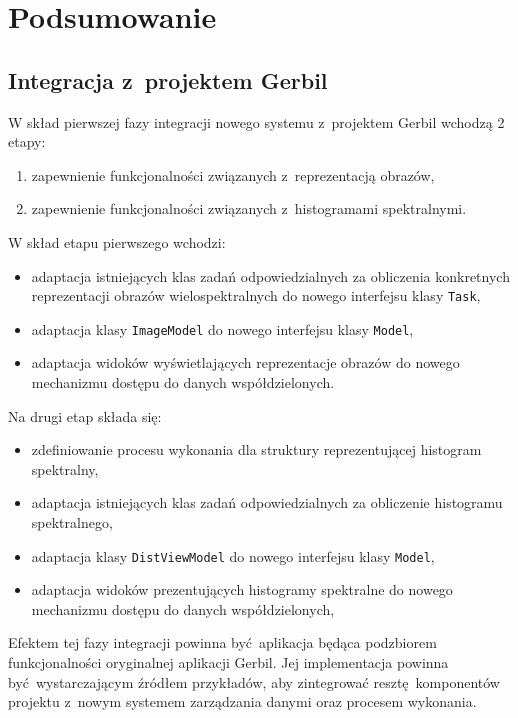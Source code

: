 \chapter{Podsumowanie}

\section{Integracja z~projektem Gerbil}
W skład pierwszej fazy integracji nowego systemu z~projektem Gerbil wchodzą 2 etapy:
\begin{enumerate}[labelwidth=\widthof{\ref{last-item2}},label=\arabic*.]
	\item zapewnienie funkcjonalności związanych z~reprezentacją obrazów,
	\item zapewnienie funkcjonalności związanych z~histogramami spektralnymi.
\end{enumerate}

W skład etapu pierwszego wchodzi: 
\begin{itemize}
		\item adaptacja istniejących klas zadań odpowiedzialnych za obliczenia konkretnych reprezentacji obrazów wielospektralnych do nowego interfejsu klasy \lstinline$Task$,
		\item adaptacja klasy \lstinline$ImageModel$ do nowego interfejsu klasy \lstinline$Model$,
		\item adaptacja widoków wyświetlających reprezentacje obrazów do nowego mechanizmu dostępu do danych współdzielonych.
\end{itemize}

Na drugi etap składa się:
\begin{itemize}
		\item zdefiniowanie procesu wykonania dla struktury reprezentującej histogram spektralny,
		\item adaptacja istniejących klas zadań odpowiedzialnych za obliczenie histogramu spektralnego,
		\item adaptacja klasy \lstinline$DistViewModel$ do nowego interfejsu klasy \lstinline$Model$,
		\item adaptacja widoków prezentujących histogramy spektralne do nowego mechanizmu dostępu do danych współdzielonych,	
\end{itemize}

Efektem tej fazy integracji powinna być aplikacja będąca podzbiorem funkcjonalności oryginalnej aplikacji Gerbil. Jej implementacja powinna być wystarczającym źródłem przykładów, aby zintegrować resztę komponentów projektu z~nowym systemem zarządzania danymi oraz procesem wykonania.

